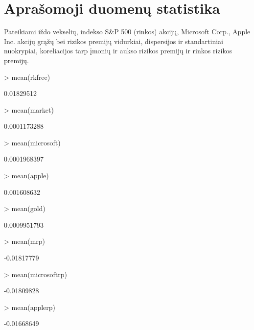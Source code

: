 \documentclass[a4paper]{article}
\begin{document}
\section{Aprašomoji duomenų statistika}

Pateikiami iždo vekselių, indekso S\&P 500 (rinkos) akcijų, Microsoft Corp., Apple Inc. akcijų grąžų bei rizikos premijų vidurkiai, dispersijos ir standartiniai nuokrypiai, koreliacijos tarp įmonių ir aukso rizikos premijų ir rinkos rizikos premijų.
\\

\begin{Schunk}
\begin{Sinput}
> mean(rkfree)
\end{Sinput}
\begin{Soutput}
[1] 0.01829512
\end{Soutput}
\begin{Sinput}
> mean(market)
\end{Sinput}
\begin{Soutput}
[1] 0.0001173288
\end{Soutput}
\begin{Sinput}
> mean(microsoft)
\end{Sinput}
\begin{Soutput}
[1] 0.0001968397
\end{Soutput}
\begin{Sinput}
> mean(apple)
\end{Sinput}
\begin{Soutput}
[1] 0.001608632
\end{Soutput}
\begin{Sinput}
> mean(gold)
\end{Sinput}
\begin{Soutput}
[1] 0.0009951793
\end{Soutput}
\begin{Sinput}
> mean(mrp)
\end{Sinput}
\begin{Soutput}
[1] -0.01817779
\end{Soutput}
\begin{Sinput}
> mean(microsoftrp)
\end{Sinput}
\begin{Soutput}
[1] -0.01809828
\end{Soutput}
\begin{Sinput}
> mean(applerp)
\end{Sinput}
\begin{Soutput}
[1] -0.01668649
\end{Soutput}

\end{Schunk}
\end{document}

